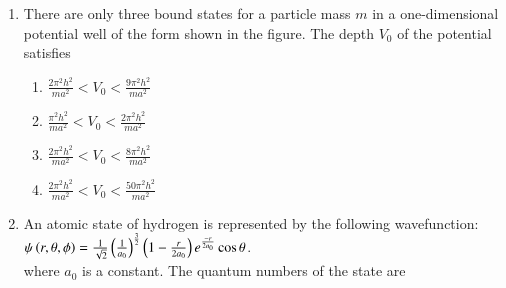 \documentclass[journal]{IEEEtran}
\begin{document}
\begin{enumerate}
\begin{multicols}{4}
    \begin{enumerate}
        \item $2i\hbar x^2$
        \item $-2i\hbar x^2$
        \item $3i\hbar x^2$
        \item $-3i\hbar x^2$
    \end{enumerate}
\end{multicols}
\item There are only three bound states for a particle mass $m$ in a one-dimensional potential well of the form shown in the figure. The depth $V_0$ of the potential satisfies
\begin{minipage}[t]{0.5\textwidth}
\raggedleft
{}
\end{minipage}
\begin{multicols}{2}
    \begin{enumerate}
        \item $\frac{2\pi^2 h^2}{ma^2}<V_0<\frac{9\pi^2 h^2}{ma^2}$
        \item $\frac{\pi^2 h^2}{ma^2}<V_0<\frac{2\pi^2 h^2}{ma^2}$
        \item $\frac{2\pi^2 h^2}{ma^2}<V_0<\frac{8\pi^2 h^2}{ma^2}$
        \item $\frac{2\pi^2 h^2}{ma^2}<V_0<\frac{50\pi^2 h^2}{ma^2}$
    \end{enumerate}
\end{multicols}
\item An atomic state of hydrogen is represented by the following wavefunction:\\
	$\psi\left(r,\theta,\phi\right)=\frac{1}{\sqrt{2}}\left(\frac{1}{a_0}\right)^{\frac{3}{2}}\left(1-\frac{r}{2a_0}\right)e^{\frac{-r}{2a_0}}\cos\theta$.\\ where $a_0$ is a constant. The quantum numbers of the state are
\begin{multicols}{2}

\end{multicols}
\end{enumerate}
\end{document}
